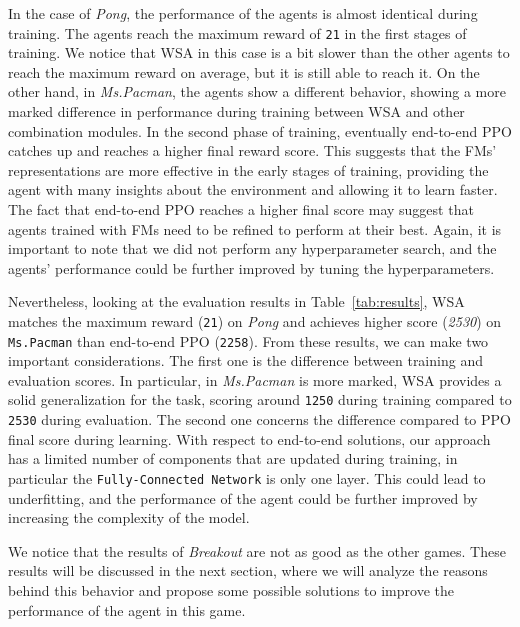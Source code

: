 In the case of \textit{Pong}, the performance of the agents is almost identical during training.
The agents reach the maximum reward of \texttt{21} in the first stages of training.
We notice that WSA in this case is a bit slower than the other agents to reach the maximum reward on average, but it is still able to reach it.
On the other hand, in \textit{Ms.Pacman}, the agents show a different behavior, showing a more marked difference in performance during training between WSA and other combination modules.
In the second phase of training, eventually end-to-end PPO catches up and reaches a higher final reward score.
This suggests that the FMs' representations are more effective in the early stages of training, providing the agent with many insights about the environment and allowing it to learn faster.
The fact that end-to-end PPO reaches a higher final score may suggest that agents trained with FMs need to be refined to perform at their best.
Again, it is important to note that we did not perform any hyperparameter search, and the agents' performance could be further improved by tuning the hyperparameters.

Nevertheless, looking at the evaluation results in Table~\ref{tab:results}, WSA matches the maximum reward (\texttt{21}) on \textit{Pong} and achieves higher score (\textit{2530}) on \texttt{Ms.Pacman} than end-to-end PPO (\texttt{2258}).
From these results, we can make two important considerations.
The first one is the difference between training and evaluation scores.
In particular, in \textit{Ms.Pacman} is more marked, WSA provides a solid generalization for the task, scoring around \texttt{1250} during training compared to \texttt{2530} during evaluation.
The second one concerns the difference compared to PPO final score during learning.
With respect to end-to-end solutions, our approach has a limited number of components that are updated during training, in particular the \texttt{Fully-Connected Network} is only one layer.
This could lead to underfitting, and the performance of the agent could be further improved by increasing the complexity of the model.

We notice that the results of \textit{Breakout} are not as good as the other games.
These results will be discussed in the next section, where we will analyze the reasons behind this behavior and propose some possible solutions to improve the performance of the agent in this game.




